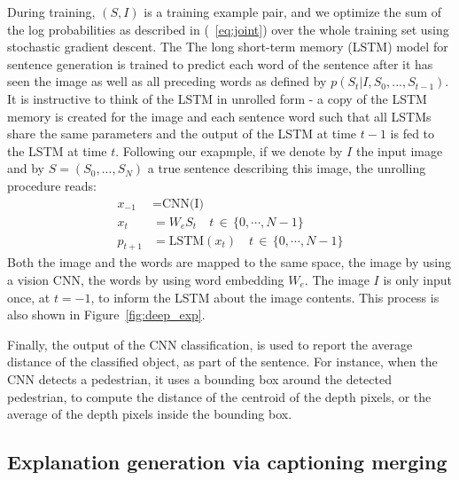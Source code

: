 During training, $(S, I)$ is a training example pair, and we optimize the sum of the log probabilities as described in (~\ref{eq:joint}) over the whole training set using stochastic gradient descent.
The The long short-term memory (LSTM) model for sentence generation is trained to predict each word of the sentence after it has seen the image as well as all preceding words as defined by $p(S_t|I, S_0, . . . , S_{t-1})$.
It is instructive to think of the LSTM in unrolled form - a copy of the LSTM memory is created for the image and each sentence word such that all LSTMs share the same parameters and the output of the LSTM at time $t-1$ is fed to the LSTM at time $t$.
Following our exapmple, if we denote by $I$ the input image and by $S = (S_0, . . . , S_N )$ a true sentence describing this image, the unrolling procedure reads:
\begin{align}
    x_{-1} &= \text{CNN(I)} \\
    x_t &= W_e S_t \quad t \, \in \, \{0, \cdots, N-1 \} \\
    p_{t+1} &= \text{LSTM}(x_t)  \quad t \, \in \, \{0, \cdots, N-1 \}
\end{align}
Both the image and the words are mapped to the same space, the image by using a vision CNN, the words by using word embedding $W_e$.
The image $I$ is only input once, at $t = -1$, to inform the LSTM about the image contents. This process is also shown in Figure~\ref{fig:deep_exp}.

Finally, the output of the CNN classification, is used to report the average distance of the classified object, as part of the sentence. For instance, when the CNN detects a pedestrian, it uses a bounding box around the detected pedestrian, to compute the distance of the centroid of the depth pixels, or the average of the depth pixels inside the bounding box. 

\subsection{Explanation generation via captioning merging}
\label{subsec:explain}

